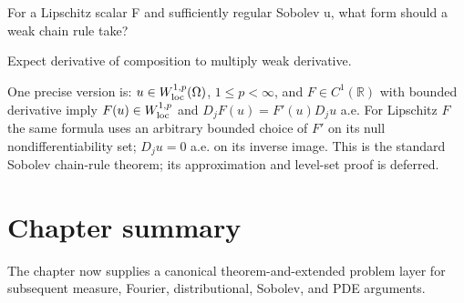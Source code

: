 \begin{exercise}\label{exr:iii20-expand-16}
For a Lipschitz scalar F and sufficiently regular Sobolev u, what form should a weak chain rule take?
\end{exercise}
\begin{hint}
Expect derivative of composition to multiply weak derivative.
\end{hint}
\begin{solution}
One precise version is: $u\in W^{1,p}_{\rm loc}(\Omega)$, $1\le p<\infty$, and $F\in C^1(\mathbb R)$ with bounded derivative imply $F(u)\in W^{1,p}_{\rm loc}$ and $D_jF(u)=F'(u)D_ju$ a.e. For Lipschitz $F$ the same formula uses an arbitrary bounded choice of $F'$ on its null nondifferentiability set; $D_ju=0$ a.e. on its inverse image. This is the standard Sobolev chain-rule theorem; its approximation and level-set proof is deferred.
\end{solution}
\section*{Chapter summary}
The chapter now supplies a canonical theorem-and-extended problem layer for subsequent measure, Fourier, distributional, Sobolev, and PDE arguments.
